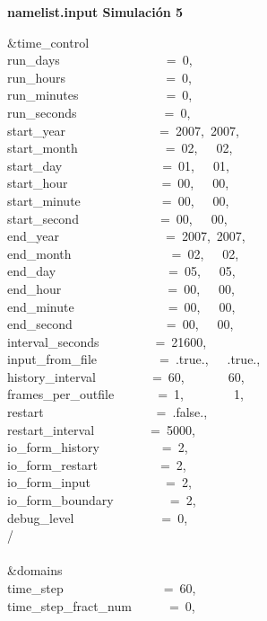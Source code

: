 
\textbf{namelist.input Simulación 5}

\&time\_control~~~~~~~~~~~~\\
run\_days~~~~~~~~~~~~~~~~~=~0,\\
run\_hours~~~~~~~~~~~~~~~~=~0,\\
run\_minutes~~~~~~~~~~~~~~=~0,\\
run\_seconds~~~~~~~~~~~~~~=~0,\\
start\_year~~~~~~~~~~~~~~~=~2007,~2007,~\\
start\_month~~~~~~~~~~~~~~=~02,~~~02,~~~\\
start\_day~~~~~~~~~~~~~~~~=~01,~~~01,~~~\\
start\_hour~~~~~~~~~~~~~~~=~00,~~~00,~~~\\
start\_minute~~~~~~~~~~~~~=~00,~~~00,~~~\\
start\_second~~~~~~~~~~~~~=~00,~~~00,~~~\\
end\_year~~~~~~~~~~~~~~~~~=~2007,~2007,~\\
end\_month~~~~~~~~~~~~~~~~=~02,~~~02,~~~\\
end\_day~~~~~~~~~~~~~~~~~~=~05,~~~05,~~~\\
end\_hour~~~~~~~~~~~~~~~~~=~00,~~~00,~~~\\
end\_minute~~~~~~~~~~~~~~~=~00,~~~00,~~~\\
end\_second~~~~~~~~~~~~~~~=~00,~~~00,~~~\\
interval\_seconds~~~~~~~~~=~21600,\\
input\_from\_file~~~~~~~~~~=~.true.,~~~.true.,~\\
history\_interval~~~~~~~~~=~60,~~~~~~~60,~~~~~\\
frames\_per\_outfile~~~~~~~=~1,~~~~~~~~1,~~~~~~\\
restart~~~~~~~~~~~~~~~~~~=~.false.,\\
restart\_interval~~~~~~~~~=~5000,\\
io\_form\_history~~~~~~~~~~=~2,\\
io\_form\_restart~~~~~~~~~~=~2,\\
io\_form\_input~~~~~~~~~~~~=~2,\\
io\_form\_boundary~~~~~~~~~=~2,\\
debug\_level~~~~~~~~~~~~~~=~0,\\
/\\
\\
\&domains~~~~~~~~~~~~~~~~~\\
time\_step~~~~~~~~~~~~~~~~=~60,\\
time\_step\_fract\_num~~~~~~=~0,\\
